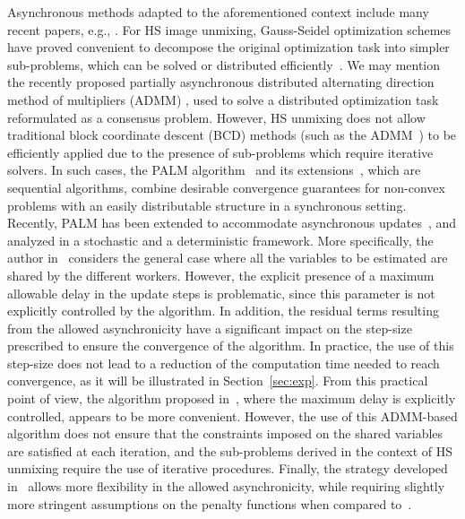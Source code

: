 \documentclass[journal,final,letterpaper,twoside,twocolumn]{IEEEtran}
\begin{document}
Asynchronous methods adapted to the aforementioned context include many recent papers, e.g., \cite{Lian2015,Chang2016,Peng2016,Davis2016,Cannelli2016}. For HS image unmixing, Gauss-Seidel optimization schemes have proved convenient to decompose the original optimization task into simpler sub-problems, which can be solved or distributed efficiently~\cite{Wright2015}. We may mention the recently proposed partially asynchronous distributed alternating direction method of multipliers (ADMM) \cite{Chang2016}, used to solve a distributed optimization task reformulated as a consensus problem. However, HS unmixing does not allow traditional block coordinate descent (BCD) methods (such as the ADMM~\cite{Boyd2010,Wang2016}) to be efficiently applied due to the presence of sub-problems which require iterative solvers. In such cases, the PALM algorithm~\cite{Bolte2013} and its extensions~\cite{Frankel2015,Chouzenoux2016}, which are sequential algorithms, combine desirable convergence guarantees for non-convex problems with an easily distributable structure in a synchronous setting. Recently, PALM has been extended to accommodate asynchronous updates~\cite{Davis2016}, and analyzed in a stochastic and a deterministic framework. More specifically, the author in~\cite{Davis2016} considers the general case where all the variables to be estimated are shared by the different workers. However, the explicit presence of a maximum allowable delay in the update steps is problematic, since this parameter is not explicitly controlled by the algorithm. In addition, the residual terms resulting from the allowed asynchronicity have a significant impact on the step-size prescribed to ensure the convergence of the algorithm. In practice, the use of this step-size does not lead to a reduction of the computation time needed to reach convergence, as it will be illustrated in Section~\ref{sec:exp}. From this practical point of view, the algorithm proposed in~\cite{Chang2016}, where the maximum delay is explicitly controlled, appears to be more convenient. However, the use of this ADMM-based algorithm does not ensure that the constraints imposed on the shared variables are satisfied at each iteration, and the sub-problems derived in the context of HS unmixing require the use of iterative procedures.
Finally, the strategy developed in~\cite{Cannelli2016} allows more flexibility in the allowed asynchronicity, while requiring  slightly more stringent assumptions on the penalty functions when compared to~\cite{Davis2016}.
\end{document}
